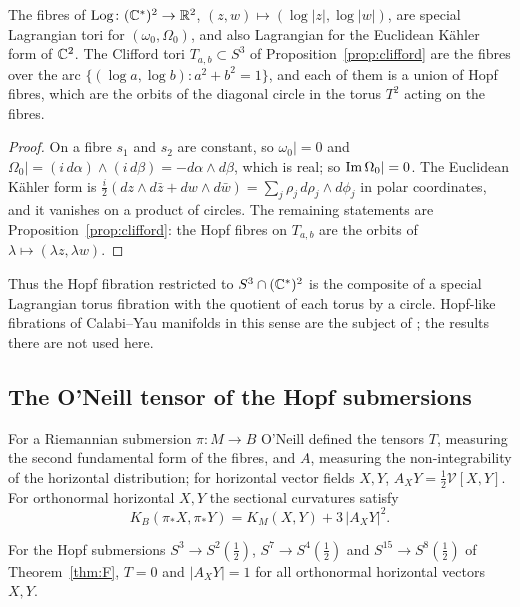 \begin{proposition}\label{prop:slag}
The fibres of $\operatorname{Log}\colon(\mathbb{C}^*)^2\to\mathbb{R}^2$, $(z,w)\mapsto(\log|z|,\log|w|)$, are special Lagrangian tori for $(\omega_0,\Omega_0)$, and also Lagrangian for the Euclidean K\"ahler form of $\mathbb{C}^2$. The Clifford tori $T_{a,b}\subset S^3$ of Proposition~\ref{prop:clifford} are the fibres over the arc $\{(\log a,\log b):a^2+b^2=1\}$, and each of them is a union of Hopf fibres, which are the orbits of the diagonal circle in the torus $T^2$ acting on the fibres.
\end{proposition}

\begin{proof}
On a fibre $s_1$ and $s_2$ are constant, so $\omega_0|=0$ and $\Omega_0|=(i\,d\alpha)\wedge(i\,d\beta)=-d\alpha\wedge d\beta$, which is real; so $\operatorname{Im}\Omega_0|=0$. The Euclidean K\"ahler form is $\frac i2(dz\wedge d\bar z+dw\wedge d\bar w)=\sum_j\rho_j\,d\rho_j\wedge d\phi_j$ in polar coordinates, and it vanishes on a product of circles. The remaining statements are Proposition~\ref{prop:clifford}: the Hopf fibres on $T_{a,b}$ are the orbits of $\lambda\mapsto(\lambda z,\lambda w)$.
\end{proof}

Thus the Hopf fibration restricted to $S^3\cap(\mathbb{C}^*)^2$ is the composite of a special Lagrangian torus fibration with the quotient of each torus by a circle. Hopf-like fibrations of Calabi--Yau manifolds in this sense are the subject of \cite{BFS26}; the results there are not used here.

\subsection{The O'Neill tensor of the Hopf submersions}\label{sec:oneill}

For a Riemannian submersion $\pi\colon M\to B$ O'Neill \cite{ONe66} defined the tensors $T$, measuring the second fundamental form of the fibres, and $A$, measuring the non-integrability of the horizontal distribution; for horizontal vector fields $X,Y$, $A_XY=\tfrac12\mathcal V[X,Y]$. For orthonormal horizontal $X,Y$ the sectional curvatures satisfy
\begin{equation}\label{eq:oneill}
K_B(\pi_*X,\pi_*Y)=K_M(X,Y)+3\,|A_XY|^2 .
\end{equation}

\begin{proposition}\label{prop:oneill}
For the Hopf submersions $S^3\to S^2(\frac12)$, $S^7\to S^4(\frac12)$ and $S^{15}\to S^8(\frac12)$ of Theorem~\ref{thm:F}, $T=0$ and $|A_XY|=1$ for all orthonormal horizontal vectors $X,Y$.
\end{proposition}

